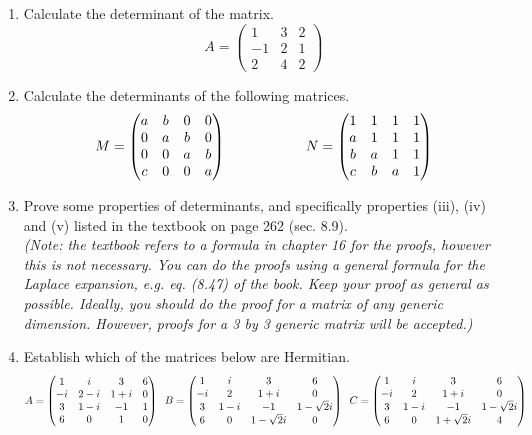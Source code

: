 \documentclass[fleqn]{article}
\begin{document}
  \begin{enumerate}
    \item  Calculate the determinant of the matrix. $$A = 
      \begin{pmatrix}
      1 & 3 & 2 \\
      -1 & 2 & 1 \\
      2 & 4 & 2
      \end{pmatrix} $$


    \item  Calculate the determinants of the following matrices. $$M = 
      \begin{pmatrix}
      a & b & 0 & 0 \\
      0 & a & b & 0 \\
      0 & 0 & a & b \\
      c & 0 & 0 & a
      \end{pmatrix} \hskip 2truecm
      N=\begin{pmatrix}
        1 & 1 & 1 & 1 \\
        a & 1 & 1 & 1 \\
        b &a & 1 & 1 \\
        c & b & a & 1
      \end{pmatrix}
      $$

    \item Prove some properties of determinants, and specifically properties (iii), (iv) and (v) listed in the textbook on page 262 (sec. 8.9). \\
    \emph{(Note: the textbook refers to a formula in chapter 16 for the proofs, however this is not necessary. You can do the proofs using a general formula for the Laplace expansion, e.g. eq. (8.47) of the book. Keep your proof as general as possible. Ideally, you should do the proof for a matrix of any generic dimension. However, proofs for a 3 by 3 generic matrix will be accepted.) }


    \item Establish which of the matrices below are Hermitian. $$A = 
      \begin{pmatrix}
        1 & i & 3 & 6 \\
        -i & 2-i & 1+i  & 0 \\
        3 & 1-i & -1 & 1 \\
        6 & 0 & 1 & 0 \\
      \end{pmatrix}\hskip 0.2truecm 
      B=\begin{pmatrix}
        1 & i & 3 & 6 \\
        -i & 2 & 1+i  & 0 \\
        3 & 1-i & -1 & 1-\sqrt{2}i \\
        6 & 0 & 1-\sqrt{2}i & 0 \\
      \end{pmatrix}
      \hskip 0.2truecm 
      C=\begin{pmatrix}
        1 & i & 3 & 6 \\
        -i & 2 & 1+i  & 0 \\
        3 & 1-i & -1 & 1-\sqrt{2}i \\
        6 & 0 & 1+\sqrt{2}i & 4 \\
      \end{pmatrix}
      $$


\end{enumerate}
\end{document}
